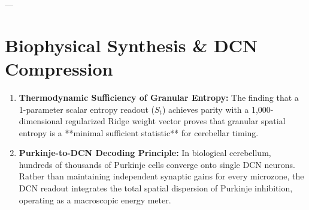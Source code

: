 \documentclass[11pt,twoside,a4paper]{article}
\begin{document}
---

\section{Biophysical Synthesis \& DCN Compression}

\begin{enumerate}
    \item \textbf{Thermodynamic Sufficiency of Granular Entropy:}
    The finding that a 1-parameter scalar entropy readout ($S_t$) achieves parity with a 1,000-dimensional regularized Ridge weight vector proves that granular spatial entropy is a **minimal sufficient statistic** for cerebellar timing.
    
    \item \textbf{Purkinje-to-DCN Decoding Principle:}
    In biological cerebellum, hundreds of thousands of Purkinje cells converge onto single DCN neurons. Rather than maintaining independent synaptic gains for every microzone, the DCN readout integrates the total spatial dispersion of Purkinje inhibition, operating as a macroscopic energy meter.
\end{enumerate}
\end{document}
